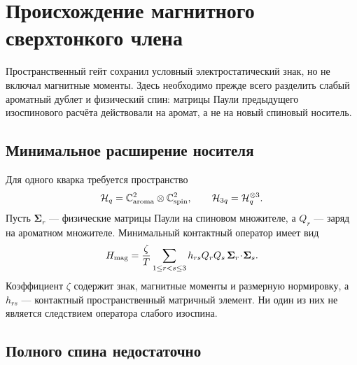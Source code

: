 \chapter{Происхождение магнитного сверхтонкого члена}
\label{ch:v8-baryon-em-magnetic-hyperfine-origin-gate}

Пространственный гейт сохранил условный электростатический знак, но не
включал магнитные моменты. Здесь необходимо прежде всего разделить слабый
ароматный дублет и физический спин: матрицы Паули предыдущего
изоспинового расчёта действовали на аромат, а не на новый спиновый носитель.

\section{Минимальное расширение носителя}

Для одного кварка требуется пространство
\begin{equation}
 \mathcal H_{q}=\mathbb C^2_{\rm aroma}\otimes\mathbb C^2_{\rm spin},
 \qquad
 \mathcal H_{3q}=\mathcal H_q^{\otimes3}.
 \label{eq:v8-baryon-em-spin-flavor-carrier}
\end{equation}
Пусть $\boldsymbol\Sigma_r$ --- физические матрицы Паули на спиновом
множителе, а $Q_r$ --- заряд на ароматном множителе. Минимальный
контактный оператор имеет вид
\begin{equation}
 H_{\rm mag}=\frac{\zeta}{T}
 \sum_{1\le r<s\le3}h_{rs}Q_rQ_s\,
 \boldsymbol\Sigma_r\!\cdot\!\boldsymbol\Sigma_s.
 \label{eq:v8-baryon-em-magnetic-contact-operator}
\end{equation}
Коэффициент $\zeta$ содержит знак, магнитные моменты и размерную
нормировку, а $h_{rs}$ --- контактный пространственный матричный элемент.
Ни один из них не является следствием оператора слабого изоспина.

\section{Полного спина недостаточно}

